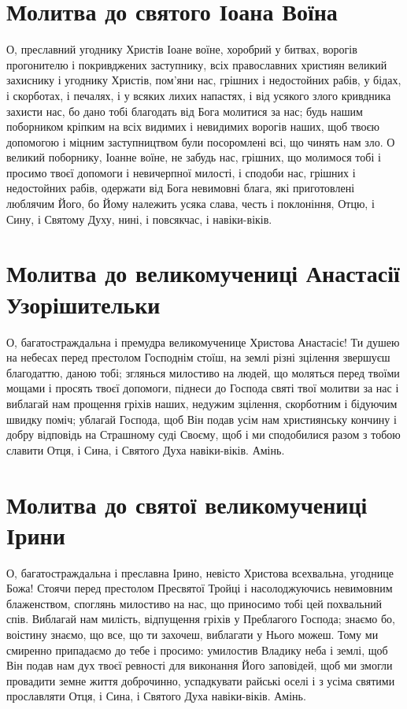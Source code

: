 \documentclass[chapters.tex]{subfiles}
\begin{document}
\section{Молитва до святого Іоана Воїна}
О, преславний угоднику Христів Іоане воїне, хоробрий у битвах, ворогів прогонителю і покривджених заступнику, всіх православних християн великий захиснику і угоднику Христів, пом’яни нас, грішних і недостойних рабів, у бідах, і скорботах, і печалях, і у всяких лихих напастях, і від усякого злого кривдника захисти нас, бо дано тобі благодать від Бога молитися за нас; будь нашим поборником кріпким на всіх видимих і невидимих ворогів наших, щоб твоєю допомогою і міцним заступництвом були посоромлені всі, що чинять нам зло. О великий поборнику, Іоанне воїне, не забудь нас, грішних, що молимося тобі і просимо твоєї допомоги і невичерпної милості, і сподоби нас, грішних і недостойних рабів, одержати від Бога невимовні блага, які приготовлені люблячим Його, бо Йому належить усяка слава, честь і поклоніння, Отцю, і Сину, і Святому Духу, нині, і повсякчас, і навіки-віків.

\section{Молитва до великомучениці Анастасії Узорішительки}
О, багатостраждальна і премудра великомученице Христова Анастасіє! Ти душею на небесах перед престолом Господнім стоїш, на землі різні зцілення звершуєш благодаттю, даною тобі; зглянься милостиво на людей, що моляться перед твоїми мощами і просять твоєї допомоги, піднеси до Господа святі твої молитви за нас і виблагай нам прощення гріхів наших, недужим зцілення, скорботним і бідуючим швидку поміч; ублагай Господа, щоб Він подав усім нам християнську кончину і добру відповідь на Страшному суді Своєму, щоб і ми сподобилися разом з тобою славити Отця, і Сина, і Святого Духа навіки-віків. Амінь.

\section{Молитва до святої великомучениці Ірини}
О, багатостраждальна і преславна Ірино, невісто Христова всехвальна, угоднице Божа! Стоячи перед престолом Пресвятої Тройці і насолоджуючись невимовним блаженством, споглянь милостиво на нас, що приносимо тобі цей похвальний спів. Виблагай нам милість, відпущення гріхів у Преблагого Господа; знаємо бо, воістину знаємо, що все, що ти захочеш, виблагати у Нього можеш. Тому ми смиренно припадаємо до тебе і просимо: умилостив Владику неба і землі, щоб Він подав нам дух твоєї ревності для виконання Його заповідей, щоб ми змогли провадити земне життя доброчинно, успадкувати райські оселі і з усіма святими прославляти Отця, і Сина, і Святого Духа навіки-віків. Амінь.
\end{document}
